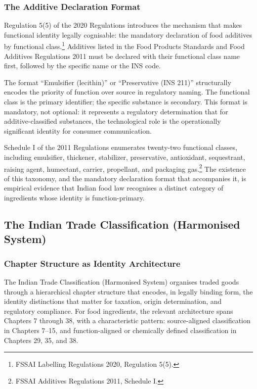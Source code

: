 \documentclass[12pt,a3paper]{article}
\begin{document}
\subsubsection{The Additive Declaration Format}

Regulation 5(5) of the 2020 Regulations introduces the mechanism that makes functional identity legally cognisable: the mandatory declaration of food additives by functional class.\footnote{FSSAI Labelling Regulations 2020, Regulation 5(5).} Additives listed in the Food Products Standards and Food Additives Regulations 2011 must be declared with their functional class name first, followed by the specific name or the INS code.

The format ``Emulsifier (lecithin)'' or ``Preservative (INS 211)'' structurally encodes the priority of function over source in regulatory naming. The functional class is the primary identifier; the specific substance is secondary. This format is mandatory, not optional: it represents a regulatory determination that for additive-classified substances, the technological role is the operationally significant identity for consumer communication.

Schedule I of the 2011 Regulations enumerates twenty-two functional classes, including emulsifier, thickener, stabilizer, preservative, antioxidant, sequestrant, raising agent, humectant, carrier, propellant, and packaging gas.\footnote{FSSAI Additives Regulations 2011, Schedule I.} The existence of this taxonomy, and the mandatory declaration format that accompanies it, is empirical evidence that Indian food law recognises a distinct category of ingredients whose identity is function-primary.

\subsection{The Indian Trade Classification (Harmonised System)}

\subsubsection{Chapter Structure as Identity Architecture}

The Indian Trade Classification (Harmonised System) organises traded goods through a hierarchical chapter structure that encodes, in legally binding form, the identity distinctions that matter for taxation, origin determination, and regulatory compliance. For food ingredients, the relevant architecture spans Chapters 7 through 38, with a characteristic pattern: source-aligned classification in Chapters 7--15, and function-aligned or chemically defined classification in Chapters 29, 35, and 38.
\end{document}

